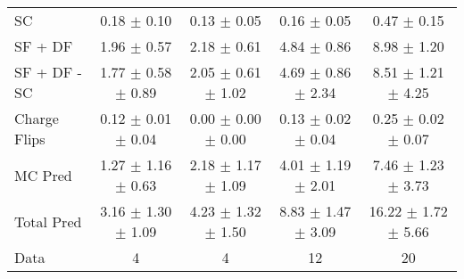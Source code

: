 \begin{tabular}{l|cccc}
                                 SC &  0.18 $\pm$  0.10 &  0.13 $\pm$  0.05 &  0.16 $\pm$  0.05 &  0.47 $\pm$  0.15 \\
                            SF + DF &  1.96 $\pm$  0.57 &  2.18 $\pm$  0.61 &  4.84 $\pm$  0.86 &  8.98 $\pm$  1.20 \\
\hline
                       SF + DF - SC &  1.77 $\pm$  0.58 $\pm$  0.89 &  2.05 $\pm$  0.61 $\pm$  1.02 &  4.69 $\pm$  0.86 $\pm$  2.34 &  8.51 $\pm$  1.21 $\pm$  4.25 \\
\hline\hline
                       Charge Flips &  0.12 $\pm$  0.01 $\pm$  0.04 &  0.00 $\pm$  0.00 $\pm$  0.00 &  0.13 $\pm$  0.02 $\pm$  0.04 &  0.25 $\pm$  0.02 $\pm$  0.07 \\
\hline
                            MC Pred &  1.27 $\pm$  1.16 $\pm$  0.63 &  2.18 $\pm$  1.17 $\pm$  1.09 &  4.01 $\pm$  1.19 $\pm$  2.01 &  7.46 $\pm$  1.23 $\pm$  3.73 \\
\hline
                         Total Pred &  3.16 $\pm$  1.30 $\pm$  1.09 &  4.23 $\pm$  1.32 $\pm$  1.50 &  8.83 $\pm$  1.47 $\pm$  3.09 & 16.22 $\pm$  1.72 $\pm$  5.66 \\
\hline\hline
                               Data &     4 &     4 &    12 &    20 \\
\hline\hline
\end{tabular}


